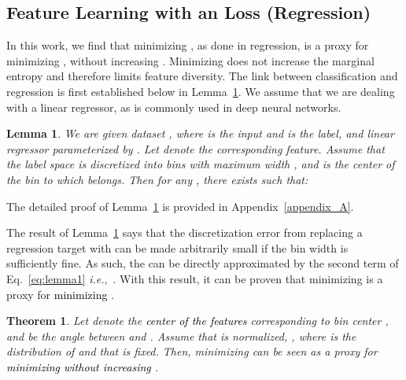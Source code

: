 \documentclass{article} \usepackage{iclr2023_conference,times}
\makeatletter
\newcommand*{\ie}{i.e.\@\xspace}
\def\ie{\mbox{\textit{i.e.}, }}
\newtheorem{thm}{Theorem}
\newtheorem{lemma}{Lemma}
\def\shihao{\textcolor{black}}
\makeatother
\begin{document}
\subsection{Feature Learning with an  Loss (Regression)} 

In this work, we find that minimizing , as done in regression, is a proxy for minimizing , without increasing .  Minimizing  does not increase the marginal entropy  and therefore limits feature diversity. The link between classification and regression is first established below in Lemma~\ref{Lemma_discretize}.  We assume that we are dealing with a linear regressor, as is commonly used in deep neural networks.

\begin{lemma}
\label{Lemma_discretize}
We are given dataset , where  is the input and  is the label,
	and linear regressor  parameterized by 
	.  
	Let  denote the corresponding feature. 
	Assume that the label space  is discretized into bins with maximum width , and  is the center of the bin to which  belongs. Then for any , there exists  such that:

\end{lemma}

The detailed proof of Lemma~\ref{Lemma_discretize} is provided in Appendix~\ref{appendix_A}. 

The result of Lemma~\ref{Lemma_discretize} says that the discretization error from replacing a regression target  with  can be made arbitrarily small if the bin width  is sufficiently fine. As such, the  can be directly approximated by the second term of Eq.~\ref{eq:lemma1} \ie  . With this result, it can be proven that minimizing  is a proxy for \shihao{minimizing} .

\begin{thm}
Let  denote the \shihao{center of the features} corresponding to bin center , and  be the angle between  and . Assume that  is normalized, , where  is the distribution of  and that  is fixed. 
Then, minimizing  can be seen as a proxy for \shihao{minimizing}  \shihao{ without increasing }.
\label{thm:1}
\end{thm}
\end{document}
